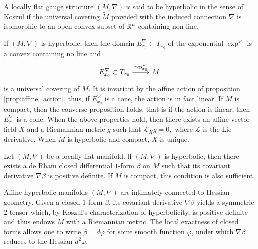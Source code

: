 \begin{defn}
\label{def:hyperbolic_koszul}
A locally flat gauge structure $\left( M, \nabla \right)$ is said to be 
hyperbolic in the sense of Koszul \citep{koszul1968} if the universal covering $\tilde{M}$ provided 
with the induced connection $\nabla$ is isomorphic to an open convex subset of $\mathbb{R}^n$ containing non line.
\end{defn}
If $\left( M, \nabla \right)$ is hyperbolic, then the domain $E^\nabla_{x_0} \subset T_{x_0}$ of the 
exponential $\exp^\nabla$ is a convex containing no line and 
\begin{equation*}
 \begin{tikzcd}
E^\nabla_{x_0} \subset T_{x_0} \ar[r,"\exp_{x_0}^\nabla"] & M
\end{tikzcd}   
\end{equation*}
is a universal covering of $M.$ It is invariant by the affine action of proposition \ref{prop:affine_action},
thus, if $E^\nabla_{x_0}$ is a cone, the action is in fact linear. 
If $M$ is compact, then the converse proposition holds, that is if the action is linear, then $E^\nabla_{x_0}$ 
is a cone.
When the above properties hold, then there exists an affine vector field $X$ and a Riemannian metric $g$ such that 
$\mathcal{L}_X g = 0,$ where $\mathcal{L}$ is the Lie derivative. When $M$ is hyperbolic and compact, 
$X$ is unique.

\begin{thm}
\label{thm:Hyper}
Let $(M,\nabla)$ be a locally flat manifold.  
If $(M,\nabla)$ is hyperbolic, then there exists a de Rham closed 
differential $1$-form $\beta$ on $M$ such that its covariant derivative 
$\nabla \beta$ is positive definite.  
If $M$ is compact, this condition is also sufficient.
\end{thm}

Affine hyperbolic manifolds $(M,\nabla)$ are intimately connected to Hessian geometry. 
Given a closed $1$-form $\beta$, its covariant derivative $\nabla\beta$ yields a symmetric $2$-tensor which, 
by Koszul's characterization of hyperbolicity, is positive definite and thus endows $M$ with a Riemannian metric. 
The local exactness of closed forms allows one to write $\beta = d\varphi$ for some smooth function $\varphi$, 
under which $\nabla\beta$ reduces to the Hessian $d^2\varphi$.

